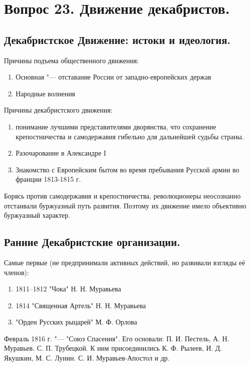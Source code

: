 \section{Вопрос 23. Движение декабристов.}

\subsection{Декабристское Движение: истоки и идеология.}

Причины подъема общественного движения:

\begin{enumerate}
    \item{ Основная "--- отставание России от западно-европейских держав }
    \item{ Народные волнения }
\end{enumerate}

Причины декабристского движения:

\begin{enumerate}
    \item{ понимание лучшими представителями дворянства, что сохранение крепостничества и самодержавия гибельно для дальнейшей судьбы страны. }
    \item{ Разочарование в Александре I }
    \item{ Знакомство с Европейским бытом во время пребывания Русской армии во франции 1813-1815 г. }
\end{enumerate}

Борясь против самодержавия и крепостничества, революционеры неосознанно отстаивали буржуазный путь развития. Поэтому их движение имело объективно буржуазный характер.

\subsection{Ранние Декабристские организации.}

Самые первые (не предпринимали активных действий, но развивали взгляды её членов):

\begin{enumerate}
    \item{1811--1812 "Чока" Н. Н. Муравьева}
    \item{1814 "Священная Артель" Н. Н. Муравьева}
    \item{"Орден Русских рыцарей" М. Ф. Орлова}
\end{enumerate}

Февраль 1816 г. "--- "Союз Спасения". Его основали: П. И. Пестель, А. Н. Муравьев. С. П. Трубецкой. К ним присоединились К. Ф. Рылеев, И. Д. Якушкин, М. С. Лунин. С. И. Муравьев-Апостол и др.

